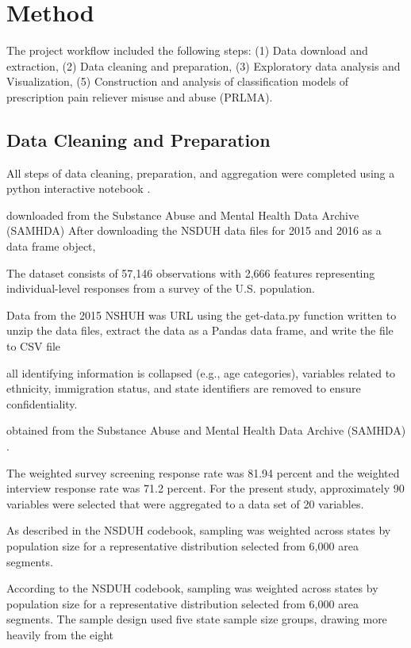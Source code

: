 \documentclass[sigconf]{acmart}
\begin{document}
\section{Method}

The project workflow included the following steps: (1) Data download and 
extraction, (2) Data cleaning and preparation, (3) Exploratory data analysis 
and Visualization, (5) Construction and analysis of classification models of
prescription pain reliever misuse and abuse (PRLMA).

\subsection{Data Cleaning and Preparation }

All steps of data cleaning, preparation, and aggregation were completed using 
a python interactive notebook \cite{mckinney17}.

downloaded from the Substance Abuse and Mental 
Health Data Archive (SAMHDA) \cite{samhsa18}
After downloading the NSDUH 
data files for 2015 and 2016 as a data frame object,




The dataset consists 
of 57,146 observations with 2,666 features representing individual-level 
responses from a survey of the U.S. population.


Data from the 2015 NSHUH was  URL using the get-data.py 
function written to unzip the data files, extract the data as a Pandas data 
frame, and write the file to CSV file

all identifying information is collapsed (e.g., age categories), 
variables related to ethnicity, immigration status, and state identifiers 
are removed to ensure confidentiality.

obtained from the Substance Abuse and Mental Health 
Data Archive (SAMHDA) \cite{samhsa16}.

The weighted survey screening response rate was 81.94 percent and the weighted 
interview response rate was 71.2 percent. For the present study, approximately
90 variables were selected that were aggregated to a data set of 20 variables. 

As described in the NSDUH codebook, sampling was weighted across states by 
population size for a representative distribution selected from 6,000 area segments. 

According 
to the NSDUH codebook, sampling was weighted across states by population size 
for a representative distribution selected from 6,000 area segments. The sample 
design used five state sample size groups, drawing more heavily from the eight 
\end{document}
